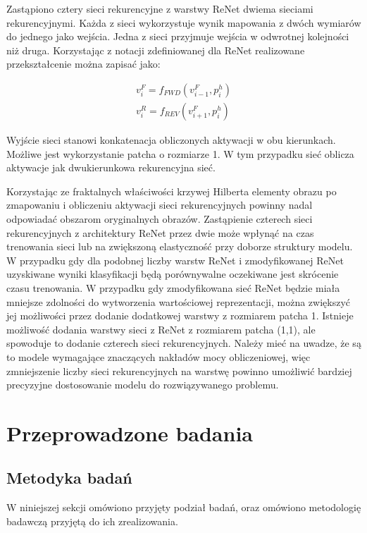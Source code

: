 \documentclass[oneside, mag]{mgr}
\begin{document}
Zastąpiono cztery sieci rekurencyjne z warstwy ReNet dwiema sieciami rekurencyjnymi. Każda z sieci wykorzystuje wynik mapowania z dwóch wymiarów do jednego jako wejścia. Jedna z sieci przyjmuje wejścia w odwrotnej kolejności niż druga. Korzystając z notacji zdefiniowanej dla ReNet realizowane przekształcenie można zapisać jako:

\begin{gather}
	v_{i}^{F} = f_{FWD}(v_{i-1}^{F}, p_{i}^{h}) \\ \nonumber
	v_{i}^{R} = f_{REV}(v_{i+1}^{F}, p_{i}^{h})
\end{gather}

Wyjście sieci stanowi konkatenacja obliczonych aktywacji w obu kierunkach. Możliwe jest wykorzystanie patcha o rozmiarze 1. W tym przypadku sieć oblicza aktywacje jak dwukierunkowa rekurencyjna sieć.

Korzystając ze fraktalnych właściwości krzywej Hilberta elementy obrazu po zmapowaniu i obliczeniu aktywacji sieci rekurencyjnych powinny nadal odpowiadać obszarom oryginalnych obrazów. Zastąpienie czterech sieci rekurencyjnych z architektury ReNet przez dwie może wpłynąć na czas trenowania sieci lub na zwiększoną elastyczność przy doborze struktury modelu. W przypadku gdy dla podobnej liczby warstw ReNet i zmodyfikowanej ReNet uzyskiwane wyniki klasyfikacji będą porównywalne oczekiwane jest skrócenie czasu trenowania. W przypadku gdy zmodyfikowana sieć ReNet będzie miała mniejsze zdolności do wytworzenia wartościowej reprezentacji, można zwiększyć jej możliwości przez dodanie dodatkowej warstwy z rozmiarem patcha 1. Istnieje możliwość dodania warstwy sieci z ReNet z rozmiarem patcha (1,1), ale spowoduje to dodanie czterech sieci rekurencyjnych. Należy mieć na uwadze, że są to modele wymagające znaczących nakładów mocy obliczeniowej, więc zmniejszenie liczby sieci rekurencyjnych na warstwę powinno umożliwić bardziej precyzyjne dostosowanie modelu do rozwiązywanego problemu.


\chapter{Przeprowadzone badania}

\section{Metodyka badań}
W niniejszej sekcji omówiono przyjęty podział badań, oraz omówiono metodologię badawczą przyjętą do ich zrealizowania.
\end{document}

